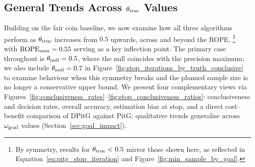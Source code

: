 \subsection{General Trends Across $\theta_{\rm true}$ Values}\label{sec:trends}

Building on the fair coin baseline, we now examine how all three algorithms perform as
$\theta_{\rm true}$ increases from $0.5$ upwards, across and beyond the ROPE,%
\footnote{By symmetry, results for $\theta_{\rm true}<0.5$ mirror those shown
here, as reflected in Equation~\ref{eq:pitg_stop_iteration} and
Figure~\ref{fig:min_sample_by_goal}.}
with ${\rm ROPE}_{\rm max}=0.55$ serving as a key inflection point.
The primary case throughout is $\theta_{\rm null}=0.5$, where the null coincides
with the precision maximum; we also include $\theta_{\rm null}=0.7$ in
Figure~\ref{fig:stop_iterations_by_truth_conclusive} to examine behaviour when
this symmetry breaks and the planned sample size is no longer a conservative
upper bound.
We present four complementary views via
Figures~\ref{fig:conclusiveness_rates}--\ref{fig:stop_conclusiveness_ratios}:
conclusiveness and decision rates, overall accuracy, estimation bias at stop, and a
direct cost--benefit comparison of DPitG against PitG; qualitative trends generalise
across $\omega_{\rm goal}$ values (Section~\ref{sec:goal_impact}).

